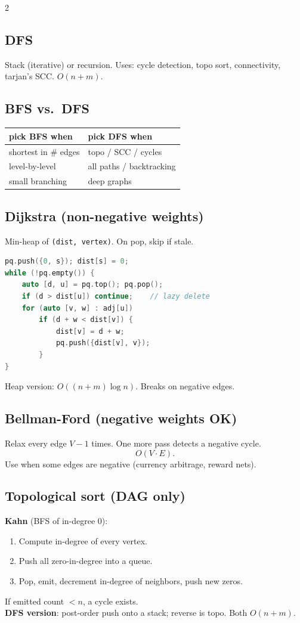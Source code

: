 \documentclass[10pt]{article}
\begin{document}
\begin{multicols}{2}
\subsection*{DFS}
Stack (iterative) or recursion. Uses: cycle detection, topo sort,
connectivity, tarjan's SCC. $O(n+m)$.

\subsection*{BFS vs.\ DFS}
\begin{tabular}{@{}l|l@{}}
\textbf{pick BFS when}  & \textbf{pick DFS when}\\
\hline
shortest in \# edges    & topo / SCC / cycles\\
level-by-level          & all paths / backtracking\\
small branching         & deep graphs
\end{tabular}

\subsection*{Dijkstra (non-negative weights)}
Min-heap of \texttt{(dist, vertex)}. On pop, skip if stale.
\begin{lstlisting}[language=C++]
pq.push({0, s}); dist[s] = 0;
while (!pq.empty()) {
    auto [d, u] = pq.top(); pq.pop();
    if (d > dist[u]) continue;    // lazy delete
    for (auto [v, w] : adj[u])
        if (d + w < dist[v]) {
            dist[v] = d + w;
            pq.push({dist[v], v});
        }
}
\end{lstlisting}
Heap version: $O((n+m)\log n)$. Breaks on negative edges.

\columnbreak

\subsection*{Bellman-Ford (negative weights OK)}
Relax every edge $V-1$ times. One more pass detects a negative
cycle.
\[
O(V \cdot E).
\]
Use when some edges are negative (currency arbitrage, reward nets).

\subsection*{Topological sort (DAG only)}
\textbf{Kahn} (BFS of in-degree 0):
\begin{enumerate}
    \item Compute in-degree of every vertex.
    \item Push all zero-in-degree into a queue.
    \item Pop, emit, decrement in-degree of neighbors, push new zeros.
\end{enumerate}
If emitted count $< n$, a cycle exists.\\
\textbf{DFS version}: post-order push onto a stack; reverse is topo.
Both $O(n+m)$.


\end{multicols}
\end{document}
